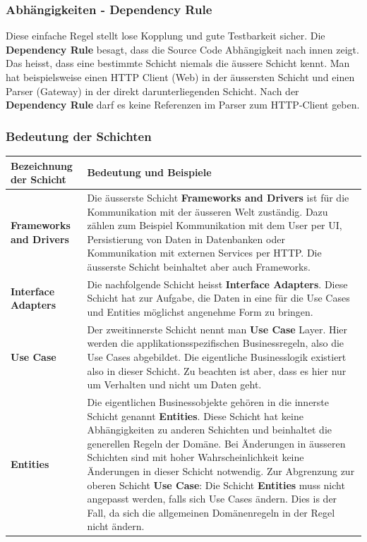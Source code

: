 \documentclass[a4paper,10pt,xetex]{article}
\begin{document}
\subsubsection{Abhängigkeiten - Dependency Rule}\label{dependencyrule}
Diese einfache Regel stellt lose Kopplung und gute Testbarkeit sicher. Die \textbf{Dependency Rule} besagt, dass die Source Code Abhängigkeit nach innen zeigt. Das heisst, dass eine bestimmte Schicht niemals die äussere Schicht kennt. Man hat beispielsweise einen HTTP Client (Web) in der äussersten Schicht und einen Parser (Gateway) in der direkt darunterliegenden Schicht. Nach der \textbf{Dependency Rule} darf es keine Referenzen im Parser zum HTTP-Client geben.

\subsubsection{Bedeutung der Schichten}\label{layers}
\begin{longtabu} to \textwidth { | l | X[l] |  }
\hline
\textbf{Bezeichnung der Schicht} & \textbf{Bedeutung und Beispiele}\\\hline
\endhead
\textbf{Frameworks and Drivers} & Die äusserste Schicht \textbf{Frameworks and Drivers} ist für die Kommunikation mit der äusseren Welt zuständig. Dazu zählen zum Beispiel Kommunikation mit dem User per UI, Persistierung von Daten in Datenbanken oder Kommunikation mit externen Services per HTTP. Die äusserste Schicht beinhaltet aber auch Frameworks.\\\hline
\textbf{Interface Adapters} & Die nachfolgende Schicht heisst \textbf{Interface Adapters}. Diese Schicht hat zur Aufgabe, die Daten in eine für die Use Cases und Entities möglichst angenehme Form zu bringen.\\\hline
\textbf{Use Case} & Der zweitinnerste Schicht nennt man \textbf{Use Case} Layer. Hier werden die applikationsspezifischen Businessregeln, also die Use Cases abgebildet. Die eigentliche Businesslogik existiert also in dieser Schicht. Zu beachten ist aber, dass es hier nur um Verhalten und nicht um Daten geht.\\\hline
\textbf{Entities} & Die eigentlichen Businessobjekte gehören in die innerste Schicht genannt \textbf{Entities}. Diese Schicht hat keine Abhängigkeiten zu anderen Schichten und beinhaltet die generellen Regeln der Domäne. Bei Änderungen in äusseren Schichten sind mit hoher Wahrscheinlichkeit keine Änderungen in dieser Schicht notwendig. Zur Abgrenzung zur oberen Schicht \textbf{Use Case}: Die Schicht \textbf{Entities} muss nicht angepasst werden, falls sich Use Cases ändern. Dies is der Fall, da sich die allgemeinen Domänenregeln in der Regel nicht ändern.\\\hline
\end{longtabu}
\end{document}
